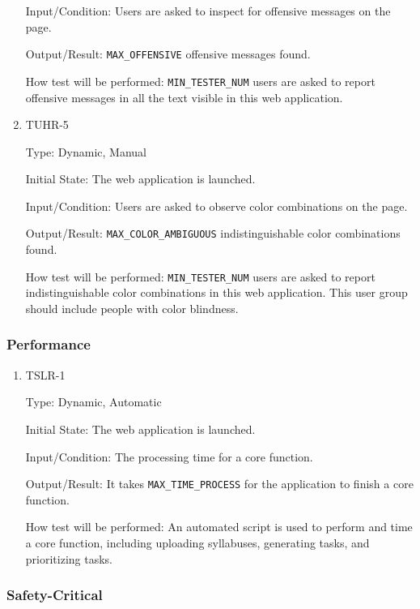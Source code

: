 \documentclass[12pt, titlepage]{article}
\begin{document}
\begin{enumerate}
Input/Condition: Users are asked to inspect for offensive messages on the page.
					
Output/Result: \texttt{MAX\_OFFENSIVE} offensive messages found.
					
How test will be performed: \texttt{MIN\_TESTER\_NUM} users are asked to report offensive messages in all the text visible in this web application.

\item{TUHR-5\\}\label{TUHR-5}

Type: Dynamic, Manual
					
Initial State: The web application is launched.
					
Input/Condition: Users are asked to observe color combinations on the page.
					
Output/Result: \texttt{MAX\_COLOR\_AMBIGUOUS} indistinguishable color combinations found.
					
How test will be performed: \texttt{MIN\_TESTER\_NUM} users are asked to report indistinguishable color combinations in this web application. This user group should include people with color blindness.


\end{enumerate}

\subsubsection{Performance}

\begin{enumerate}
\item{TSLR-1\\}\label{TSLR-1}

Type: Dynamic, Automatic
					
Initial State: The web application is launched.
					
Input/Condition: The processing time for a core function.
					
Output/Result: It takes \texttt{MAX\_TIME\_PROCESS} for the application to finish a core function.
					
How test will be performed: An automated script is used to perform and time a core function, including uploading syllabuses, generating tasks, and prioritizing tasks.

\end{enumerate}
\subsubsection{Safety-Critical}
\end{document}
